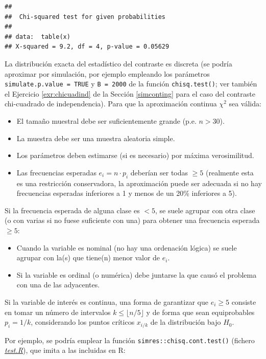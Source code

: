 \documentclass[
]{book}
\theoremstyle{break}
\theoremstyle{nonumberplain}
\begin{document}
\begin{verbatim}
## 
##  Chi-squared test for given probabilities
## 
## data:  table(x)
## X-squared = 9.2, df = 4, p-value = 0.05629
\end{verbatim}

La distribución exacta del estadístico del contraste es discreta (se podría aproximar por simulación, por ejemplo empleando los parámetros \texttt{simulate.p.value\ =\ TRUE} y \texttt{B\ =\ 2000} de la función \texttt{chisq.test()}; ver también el Ejercicio \ref{exr:chicuadind} de la Sección \ref{simconting} para el caso del contraste chi-cuadrado de independencia).
Para que la aproximación continua \(\chi^2\) sea válida:

\begin{itemize}
\item
  El tamaño muestral debe ser suficientemente grande (p.e. \(n>30\)).
\item
  La muestra debe ser una muestra aleatoria simple.
\item
  Los parámetros deben estimarse (si es necesario) por máxima
  verosimilitud.
\item
  Las frecuencias esperadas \(e_{i}=n\cdot p_{i}\) deberían ser todas
  \(\geq5\) (realmente esta es una restricción conservadora, la aproximación
  puede ser adecuada si no hay frecuencias esperadas inferiores a 1 y
  menos de un 20\% inferiores a 5).
\end{itemize}

Si la frecuencia esperada de alguna clase es \(<5\), se suele agrupar con otra
clase (o con varias si no fuese suficiente con una) para obtener una
frecuencia esperada \(\geq5\):

\begin{itemize}
\item
  Cuando la variable es nominal (no hay una ordenación lógica) se
  suele agrupar con la(s) que tiene(n) menor valor de \(e_{i}\).
\item
  Si la variable es ordinal (o numérica) debe juntarse la que causó el
  problema con una de las adyacentes.
\end{itemize}

Si la variable de interés es continua, una forma de garantizar que \(e_{i}\geq5\) consiste en tomar un número de intervalos \(k\leq \lfloor n/5 \rfloor\) y de forma que sean equiprobables \(p_{i}=1/k\),
considerando los puntos críticos \(x_{i/k}\) de la distribución bajo \(H_0\).

Por ejemplo, se podría emplear la función \texttt{simres::chisq.cont.test()} (fichero \href{R/test.R}{\emph{test.R}}), que imita a las incluidas en R:
\end{document}
